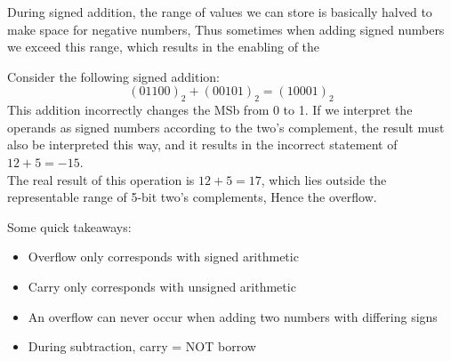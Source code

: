 \documentclass[]{report}
\newcommand{\keyword}[1]{{{\color{kwcol}{\hl{#1}}\,}}}
\begin{document}
During signed addition, the range of values we can store is basically halved to make space for negative numbers, Thus sometimes when adding signed numbers we exceed this range, which results in the enabling of the \keyword{overflow flag}

\begin{remark}
	Consider the following signed addition:
	\[	(01100)_2 + (00101)_2 = (10001)_2	\]
	This addition incorrectly changes the MSb from 0 to 1. If we interpret the operands as signed numbers according to the two's complement, the result must also be interpreted this way, and it results in the incorrect statement of $12+5=-15$.\\
	
	The real result of this operation is $12+5=17$, which lies outside the representable range of 5-bit two's complements, Hence the overflow.
\end{remark}

Some quick takeaways:
\begin{itemize}
	\item Overflow only corresponds with signed arithmetic
	\item Carry only corresponds with unsigned arithmetic
	\item An overflow can never occur when adding two numbers with differing signs
	\item During subtraction, carry = NOT borrow
\end{itemize}
\end{document}
